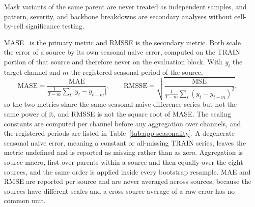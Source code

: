 \documentclass{article}
\newcommand{\introact}{\textsc{IntroAct-TS}}
\begin{document}
\begin{table}[h]
  \caption{Paired differences against the deployable baselines with the Holm adjustment.
  A negative difference favours \introact{}. The p-value is two sided and read off the same
  bootstrap draws as the interval, so it cannot fall below one over the number of resamples.}
  \label{tab:app-holm}
  \centering
  \small
  \setlength{\tabcolsep}{4pt}
\end{table}

Mask variants of the same parent are never
treated as independent samples, and pattern, severity, and backbone breakdowns are secondary
analyses without cell-by-cell significance testing.

MASE~\citep{hyndman2006mase} is the primary metric and RMSSE is the secondary metric. Both
scale the error of a source by its own seasonal naive error, computed on the TRAIN portion of
that source and therefore never on the evaluation block. With $y_t$ the target channel and $m$
the registered seasonal period of the source,
\begin{equation}
  \mathrm{MASE} = \frac{\mathrm{MAE}}{\frac{1}{T-m}\sum_{t} \lvert y_t - y_{t-m} \rvert},
  \qquad
  \mathrm{RMSSE} = \sqrt{\frac{\mathrm{MSE}}{\frac{1}{T-m}\sum_{t} (y_t - y_{t-m})^2}},
  \label{eq:metrics}
\end{equation}
so the two metrics share the same seasonal naive difference series but not the same power of
it, and RMSSE is not the square root of MASE. The scaling constants are computed per channel
before any aggregation over channels, and the registered periods are listed in
Table~\ref{tab:app-seasonality}. A degenerate seasonal naive error, meaning a constant or
all-missing TRAIN series, leaves the metric undefined and is reported as missing rather than
as zero. Aggregation is source-macro, first over parents within a source and then equally over
the eight sources, and the same order is applied inside every bootstrap resample. MAE and RMSE
are reported per source and are never averaged across sources, because the sources have
different scales and a cross-source average of a raw error has no common unit.
\end{document}
